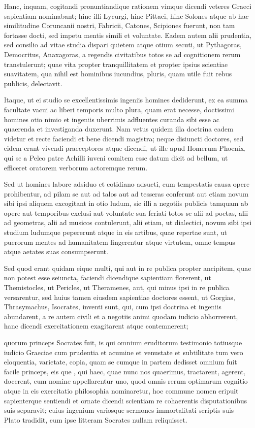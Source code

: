  Hanc, inquam, cogitandi pronuntiandique rationem vimque dicendi veteres Graeci sapientiam nominabant; hinc illi Lycurgi, hinc Pittaci, hinc Solones atque ab hac similitudine Coruncanii nostri, Fabricii, Catones, Scipiones fuerunt, non tam fortasse docti, sed impetu mentis simili et voluntate. Eadem autem alii prudentia, sed consilio ad vitae studia dispari quietem atque otium secuti, ut Pythagoras, Democritus, Anaxagoras, a regendis civitatibus totos se ad cognitionem rerum transtulerunt; quae vita propter tranquillitatem et propter ipsius scientiae suavitatem, qua nihil est hominibus iucundius, pluris, quam utile fuit rebus publicis, delectavit.

 Itaque, ut ei studio se excellentissimis ingeniis homines dediderunt, ex ea summa facultate vacui ac liberi temporis multo plura, quam erat necesse, doctissimi homines otio nimio et ingeniis uberrimis adfluentes curanda sibi esse ac quaerenda et investiganda duxerunt. Nam vetus quidem illa doctrina eadem videtur et recte faciendi et bene dicendi magistra; neque disiuncti doctores, sed eidem erant vivendi praeceptores atque dicendi, ut ille apud Homerum Phoenix, qui se a Peleo patre Achilli iuveni comitem esse datum dicit ad bellum, ut efficeret oratorem verborum actoremque rerum.

 Sed ut homines labore adsiduo et cotidiano adsueti, cum tempestatis causa opere prohibentur, ad pilam se aut ad talos aut ad tesseras conferunt aut etiam novum sibi ipsi aliquem excogitant in otio ludum, sic illi a negotiis publicis tamquam ab opere aut temporibus exclusi aut voluntate sua feriati totos se alii ad poetas, alii ad geometras, alii ad musicos contulerunt, alii etiam, ut dialectici, novum sibi ipsi studium ludumque pepererunt atque in eis artibus, quae repertae sunt, ut puerorum mentes ad humanitatem fingerentur atque virtutem, omne tempus atque aetates suas consumpserunt.

 Sed quod erant quidam eique multi, qui aut in re publica propter ancipitem, quae non potest esse seiuncta, faciendi dicendique sapientiam florerent, ut Themistocles, ut Pericles, ut Theramenes, aut, qui minus ipsi in re publica versarentur, sed huius tamen eiusdem sapientiae doctores essent, ut Gorgias, Thrasymachus, Isocrates, inventi sunt, qui, cum ipsi doctrina et ingeniis abundarent, a re autem civili et a negotiis animi quodam iudicio abhorrerent, hanc dicendi exercitationem exagitarent atque contemnerent;

 quorum princeps Socrates fuit, is qui omnium eruditorum testimonio totiusque iudicio Graeciae cum prudentia et acumine et venustate et subtilitate tum vero eloquentia, varietate, copia, quam se cumque in partem dedisset omnium fuit facile princeps, eis que , qui haec, quae nunc nos quaerimus, tractarent, agerent, docerent, cum nomine appellarentur uno, quod omnis rerum optimarum cognitio atque in eis exercitatio philosophia nominaretur, hoc commune nomen eripuit sapienterque sentiendi et ornate dicendi scientiam re cohaerentis disputationibus suis separavit; cuius ingenium variosque sermones immortalitati scriptis suis Plato tradidit, cum ipse litteram Socrates nullam reliquisset.

